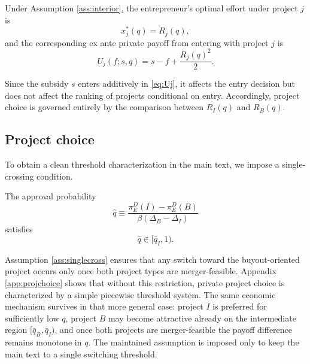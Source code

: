 Under Assumption \ref{ass:interior}, the entrepreneur's optimal effort under project \(j\) is
\begin{equation}\label{eq:xjstar}
    x_j^*(q)=R_j(q),
\end{equation}
and the corresponding ex ante private payoff from entering with project \(j\) is
\begin{equation}\label{eq:Uj}
    U_j(f;s,q)
    =
    s-f+\frac{R_j(q)^2}{2}.
\end{equation}

Since the subsidy \(s\) enters additively in \eqref{eq:Uj}, it affects the entry decision but does not affect the ranking of projects conditional on entry.
Accordingly, project choice is governed entirely by the comparison between \(R_I(q)\) and \(R_B(q)\).

\subsection{Project choice}

To obtain a clean threshold characterization in the main text, we impose a single-crossing condition.

\begin{assumption}\label{ass:singlecross}
The approval probability
\begin{equation}\label{eq:qhat}
    \hat q
    \equiv
    \frac{\pi_E^D(I)-\pi_E^D(B)}
         {\beta(\Delta_B-\Delta_I)}
\end{equation}
satisfies
\begin{equation}
    \hat q \in [\bar q_I,1).
\end{equation}
\end{assumption}

Assumption \ref{ass:singlecross} ensures that any switch toward the buyout-oriented project occurs only once both project types are merger-feasible.
Appendix \ref{app:projchoice} shows that without this restriction, private project choice is characterized by a simple piecewise threshold system.
The same economic mechanism survives in that more general case: project \(I\) is preferred for sufficiently low \(q\), project \(B\) may become attractive already on the intermediate region \([\bar q_B,\bar q_I)\), and once both projects are merger-feasible the payoff difference remains monotone in \(q\).
The maintained assumption is imposed only to keep the main text to a single switching threshold.

